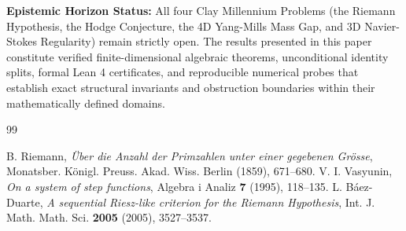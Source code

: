 \documentclass[11pt,a4paper]{article}
\theoremstyle{definition}
\begin{document}
\vspace{0.5em}
\noindent\textbf{Epistemic Horizon Status:} All four Clay Millennium Problems (the Riemann Hypothesis, the Hodge Conjecture, the 4D Yang-Mills Mass Gap, and 3D Navier-Stokes Regularity) remain strictly open. The results presented in this paper constitute verified finite-dimensional algebraic theorems, unconditional identity splits, formal Lean 4 certificates, and reproducible numerical probes that establish exact structural invariants and obstruction boundaries within their mathematically defined domains.

\begin{thebibliography}{99}

 B. Riemann, \emph{\"Uber die Anzahl der Primzahlen unter einer gegebenen Gr\"osse}, Monatsber. K\"onigl. Preuss. Akad. Wiss. Berlin (1859), 671--680.
 V. I. Vasyunin, \emph{On a system of step functions}, Algebra i Analiz \textbf{7} (1995), 118--135.
 L. B\'aez-Duarte, \emph{A sequential Riesz-like criterion for the Riemann Hypothesis}, Int. J. Math. Math. Sci. \textbf{2005} (2005), 3527--3537.

\end{thebibliography}
\end{document}
